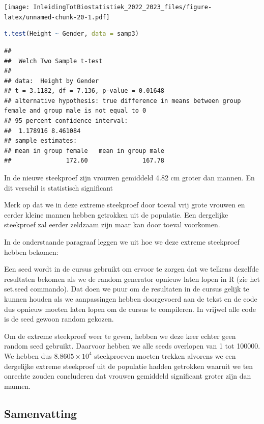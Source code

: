 \documentclass[
  12pt,dutch,coursenotes]{book}
\begin{document}
\texttt{[image: InleidingTotBiostatistiek\_2022\_2023\_files/figure-latex/unnamed-chunk-20-1.pdf]}

\begin{lstlisting}[language=R]
t.test(Height ~ Gender, data = samp3)
\end{lstlisting}

\begin{lstlisting}
## 
##  Welch Two Sample t-test
## 
## data:  Height by Gender
## t = 3.1182, df = 7.136, p-value = 0.01648
## alternative hypothesis: true difference in means between group female and group male is not equal to 0
## 95 percent confidence interval:
##  1.178916 8.461084
## sample estimates:
## mean in group female   mean in group male 
##               172.60               167.78
\end{lstlisting}

In de nieuwe steekproef zijn vrouwen gemiddeld 4.82 cm groter dan mannen. En dit verschil is statistisch significant

Merk op dat we in deze extreme steekproef door toeval vrij grote vrouwen en eerder kleine mannen hebben getrokken uit de populatie. Een dergelijke steekproef zal eerder zeldzaam zijn maar kan door toeval voorkomen.

In de onderstaande paragraaf leggen we uit hoe we deze extreme steekproef hebben bekomen:

Een seed wordt in de cursus gebruikt om ervoor te zorgen dat we telkens dezelfde resultaten bekomen als we de random generator opnieuw laten lopen in R (zie het set.seed commando). Dat doen we puur om de resultaten in de cursus gelijk te kunnen houden als we aanpassingen hebben doorgevoerd aan de tekst en de code dus opnieuw moeten laten lopen om de cursus te compileren. In vrijwel alle code is de seed gewoon random gekozen.

Om de extreme steekproef weer te geven, hebben we deze keer echter geen random seed gebruikt. Daarvoor hebben we alle seeds overlopen van 1 tot 100000. We hebben dus \ensuremath{8.8605\times 10^{4}} steekproeven moeten trekken alvorens we een dergelijke extreme steekproef uit de populatie hadden getrokken waaruit we ten onrechte zouden concluderen dat vrouwen gemiddeld significant groter zijn dan mannen.

\hypertarget{samenvatting}{%
\subsection{Samenvatting}\label{samenvatting}}
\end{document}
